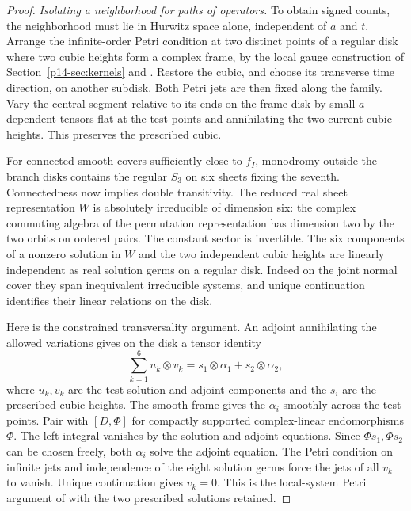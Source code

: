 \begin{proof}
\emph{Isolating a neighborhood for paths of operators.}
To obtain signed counts, the neighborhood must lie in Hurwitz space
alone, independent of $a$ and $t$. Arrange the infinite-order Petri
condition at two distinct points of a regular disk where two cubic
heights form a complex frame, by the local gauge construction of
Section~\ref{p14-sec:kernels} and \cite[Corollary~5.10]{wendl}. Restore
the cubic, and choose its transverse time direction, on another
subdisk. Both Petri jets are then fixed along the family. Vary the
central segment relative to its ends on the frame disk by small
$a$-dependent tensors flat at the test points and annihilating the two
current cubic heights. This preserves the prescribed cubic.

For connected smooth covers sufficiently close to $f_I$, monodromy
outside the branch disks contains the regular $S_3$ on six sheets
fixing the seventh. Connectedness now implies double transitivity.
The reduced real sheet representation $W$ is absolutely irreducible
of dimension six: the complex commuting algebra of the permutation
representation has dimension two by the two orbits on ordered pairs.
The constant sector is invertible. The six components of a nonzero
solution in $W$ and the two independent cubic heights are linearly
independent as real solution germs on a regular disk. Indeed on the
joint normal cover they span inequivalent irreducible systems, and
unique continuation identifies their linear relations on the disk.

Here is the constrained transversality argument. An adjoint
annihilating the allowed variations gives on the disk a tensor
identity
\[
           \sum_{k=1}^{6}u_k\otimes v_k
                    =s_1\otimes\alpha_1+s_2\otimes\alpha_2,
\]
where $u_k,v_k$ are the test solution and adjoint components and the
$s_i$ are the prescribed cubic heights. The smooth frame gives the
$\alpha_i$ smoothly across the test points. Pair with $[D,\Phi]$ for
compactly supported complex-linear endomorphisms $\Phi$.
The left integral vanishes by the solution and adjoint equations.
Since $\Phi s_1,\Phi s_2$ can be chosen freely, both $\alpha_i$ solve
the adjoint equation. The Petri condition on infinite jets and
independence of the eight solution germs force the jets of all
$v_k$ to vanish. Unique continuation gives $v_k=0$. This is the
local-system Petri argument of \cite[\S\S1.6, 2.7--2.9]{dwbn}
with the two prescribed solutions retained.


\end{proof}
